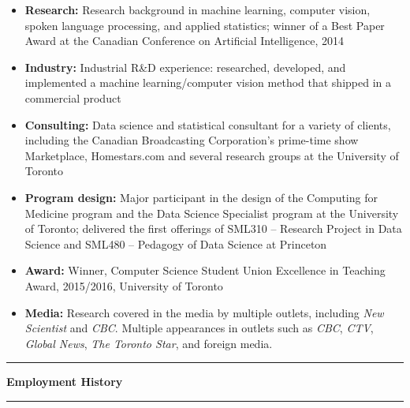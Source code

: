 \documentclass[letterpaper,11pt]{article}
\newcommand{\resheading}[1]{%
  \vspace{10pt}%
  \noindent\textcolor{accent}{\rule{3pt}{12pt}}\hspace{6pt}%
  {\large \textbf{\textcolor{accent}{#1}}}%
  \vspace{2pt}%
  \par\noindent\textcolor{accent!30}{\rule{\textwidth}{0.5pt}}%
  \vspace{2pt}%
}
\begin{document}
\begin{itemize}
\item
	\textbf{Research:} Research background in machine learning, computer vision,  spoken language processing, and applied statistics; winner of a Best Paper Award at the Canadian Conference on Artificial Intelligence, 2014
\item
	\textbf{Industry:} Industrial R\&D experience: researched, developed, and implemented a machine learning/computer vision method that shipped in a commercial product
\item
	\textbf{Consulting:} Data science and statistical consultant for a variety of clients, including the Canadian Broadcasting Corporation's prime-time show Marketplace, Homestars.com  and several research groups at the University of Toronto
\item
	\textbf{Program design:} Major participant in the design of the Computing for Medicine program and the Data Science Specialist program at the University of Toronto; delivered the first offerings of SML310 -- Research Project in Data Science and SML480 -- Pedagogy of Data Science at Princeton
\item
	\textbf{Award:} Winner, Computer Science Student Union Excellence in Teaching Award, 2015/2016, University of Toronto

\item
	\textbf{Media:} Research covered in the media by multiple outlets, including \textit{New Scientist} and \textit{CBC}. Multiple appearances in outlets such as \textit{CBC}, \textit{CTV}, \textit{Global News}, \textit{The Toronto Star}, and foreign media.

\end{itemize}
\resheading{Employment History}
\end{document}

